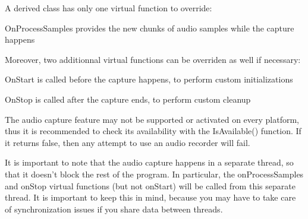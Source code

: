 A derived class has only one virtual function to override\-: \begin{DoxyItemize}
\item On\-Process\-Samples provides the new chunks of audio samples while the capture happens\end{DoxyItemize}
Moreover, two additionnal virtual functions can be overriden as well if necessary\-: \begin{DoxyItemize}
\item On\-Start is called before the capture happens, to perform custom initializations \item On\-Stop is called after the capture ends, to perform custom cleanup\end{DoxyItemize}
The audio capture feature may not be supported or activated on every platform, thus it is recommended to check its availability with the Is\-Available() function. If it returns false, then any attempt to use an audio recorder will fail.

It is important to note that the audio capture happens in a separate thread, so that it doesn't block the rest of the program. In particular, the on\-Process\-Samples and on\-Stop virtual functions (but not on\-Start) will be called from this separate thread. It is important to keep this in mind, because you may have to take care of synchronization issues if you share data between threads.

